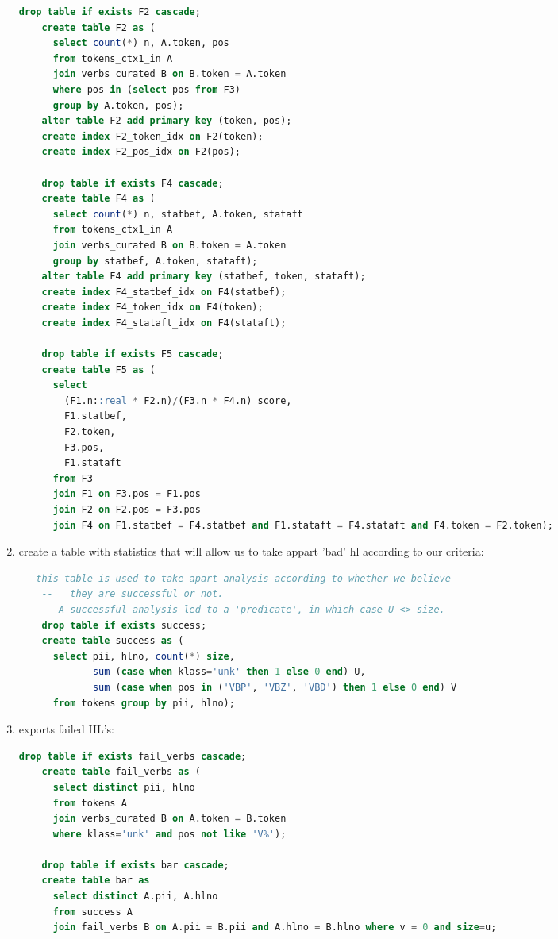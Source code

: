 \documentclass[a4paper,11pt]{report}
\begin{document}
\begin{enumerate}
\begin{lstlisting}[language=SQL]
    drop table if exists F2 cascade;
    create table F2 as (
      select count(*) n, A.token, pos
      from tokens_ctx1_in A
      join verbs_curated B on B.token = A.token
      where pos in (select pos from F3)
      group by A.token, pos);
    alter table F2 add primary key (token, pos);
    create index F2_token_idx on F2(token);
    create index F2_pos_idx on F2(pos);

    drop table if exists F4 cascade;
    create table F4 as (
      select count(*) n, statbef, A.token, stataft
      from tokens_ctx1_in A
      join verbs_curated B on B.token = A.token
      group by statbef, A.token, stataft);
    alter table F4 add primary key (statbef, token, stataft);
    create index F4_statbef_idx on F4(statbef);
    create index F4_token_idx on F4(token);
    create index F4_stataft_idx on F4(stataft);

    drop table if exists F5 cascade;
    create table F5 as (
      select
        (F1.n::real * F2.n)/(F3.n * F4.n) score,
        F1.statbef,
        F2.token,
        F3.pos,
        F1.stataft
      from F3
      join F1 on F3.pos = F1.pos
      join F2 on F2.pos = F3.pos
      join F4 on F1.statbef = F4.statbef and F1.stataft = F4.stataft and F4.token = F2.token);
  \end{lstlisting}
\item create a table with statistics that will allow us to take appart 'bad' hl according to our criteria:
  \begin{lstlisting}[language=SQL]
    -- this table is used to take apart analysis according to whether we believe
    --   they are successful or not.
    -- A successful analysis led to a 'predicate', in which case U <> size.
    drop table if exists success;
    create table success as (
      select pii, hlno, count(*) size,
             sum (case when klass='unk' then 1 else 0 end) U,
             sum (case when pos in ('VBP', 'VBZ', 'VBD') then 1 else 0 end) V
      from tokens group by pii, hlno);
  \end{lstlisting}
\item exports failed HL's:
  \begin{lstlisting}[language=SQL]
    drop table if exists fail_verbs cascade;
    create table fail_verbs as (
      select distinct pii, hlno
      from tokens A
      join verbs_curated B on A.token = B.token
      where klass='unk' and pos not like 'V%');

    drop table if exists bar cascade;
    create table bar as
      select distinct A.pii, A.hlno
      from success A
      join fail_verbs B on A.pii = B.pii and A.hlno = B.hlno where v = 0 and size=u;


\end{lstlisting}
\end{enumerate}
\end{document}
